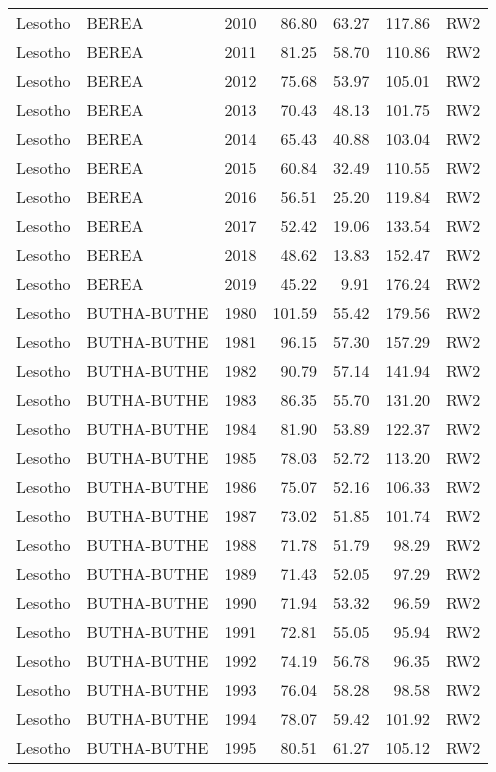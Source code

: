 \begin{longtable}{lllrrrl}
  Lesotho & BEREA & 2010 & 86.80 & 63.27 & 117.86 & RW2 \\ 
  Lesotho & BEREA & 2011 & 81.25 & 58.70 & 110.86 & RW2 \\ 
  Lesotho & BEREA & 2012 & 75.68 & 53.97 & 105.01 & RW2 \\ 
  Lesotho & BEREA & 2013 & 70.43 & 48.13 & 101.75 & RW2 \\ 
  Lesotho & BEREA & 2014 & 65.43 & 40.88 & 103.04 & RW2 \\ 
  Lesotho & BEREA & 2015 & 60.84 & 32.49 & 110.55 & RW2 \\ 
  Lesotho & BEREA & 2016 & 56.51 & 25.20 & 119.84 & RW2 \\ 
  Lesotho & BEREA & 2017 & 52.42 & 19.06 & 133.54 & RW2 \\ 
  Lesotho & BEREA & 2018 & 48.62 & 13.83 & 152.47 & RW2 \\ 
  Lesotho & BEREA & 2019 & 45.22 & 9.91 & 176.24 & RW2 \\ 
  Lesotho & BUTHA-BUTHE & 1980 & 101.59 & 55.42 & 179.56 & RW2 \\ 
  Lesotho & BUTHA-BUTHE & 1981 & 96.15 & 57.30 & 157.29 & RW2 \\ 
  Lesotho & BUTHA-BUTHE & 1982 & 90.79 & 57.14 & 141.94 & RW2 \\ 
  Lesotho & BUTHA-BUTHE & 1983 & 86.35 & 55.70 & 131.20 & RW2 \\ 
  Lesotho & BUTHA-BUTHE & 1984 & 81.90 & 53.89 & 122.37 & RW2 \\ 
  Lesotho & BUTHA-BUTHE & 1985 & 78.03 & 52.72 & 113.20 & RW2 \\ 
  Lesotho & BUTHA-BUTHE & 1986 & 75.07 & 52.16 & 106.33 & RW2 \\ 
  Lesotho & BUTHA-BUTHE & 1987 & 73.02 & 51.85 & 101.74 & RW2 \\ 
  Lesotho & BUTHA-BUTHE & 1988 & 71.78 & 51.79 & 98.29 & RW2 \\ 
  Lesotho & BUTHA-BUTHE & 1989 & 71.43 & 52.05 & 97.29 & RW2 \\ 
  Lesotho & BUTHA-BUTHE & 1990 & 71.94 & 53.32 & 96.59 & RW2 \\ 
  Lesotho & BUTHA-BUTHE & 1991 & 72.81 & 55.05 & 95.94 & RW2 \\ 
  Lesotho & BUTHA-BUTHE & 1992 & 74.19 & 56.78 & 96.35 & RW2 \\ 
  Lesotho & BUTHA-BUTHE & 1993 & 76.04 & 58.28 & 98.58 & RW2 \\ 
  Lesotho & BUTHA-BUTHE & 1994 & 78.07 & 59.42 & 101.92 & RW2 \\ 
  Lesotho & BUTHA-BUTHE & 1995 & 80.51 & 61.27 & 105.12 & RW2 \\ 

\end{longtable}
